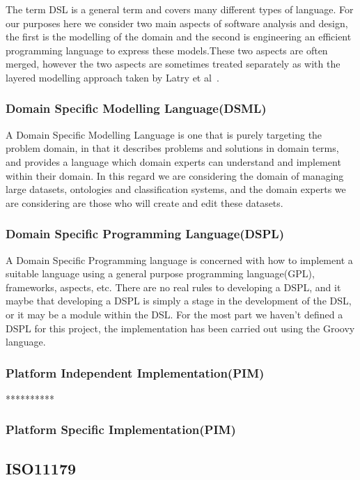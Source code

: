 \documentclass{llncs}
\begin{document}
The term DSL is a general term and covers many different types of language.  For our purposes here we consider two main aspects of software analysis and design, the first is the modelling of the domain and the second is engineering an efficient programming language to express these models.These two aspects are often merged, however the two aspects are sometimes treated separately as with the layered modelling approach taken by Latry et al~\cite{latry2006processing}. 


\subsubsection{Domain Specific Modelling Language(DSML)}

A Domain Specific Modelling Language is one that is purely targeting the problem domain, in that it describes problems and solutions in domain terms, and provides a language which domain experts can understand and implement within their domain. In this regard we are considering the domain of managing large datasets, ontologies and classification systems, and the domain experts we are considering are those who will create and edit these datasets. 

\subsubsection{Domain Specific Programming Language(DSPL)}	
A Domain Specific Programming language is concerned with how to implement a suitable language using a general purpose programming language(GPL), frameworks, aspects, etc. There are no real rules to developing a DSPL, and it maybe that developing a DSPL is simply a stage in the development of the DSL, or it may be a module within the DSL. For the most part we haven't defined a DSPL for this project, the implementation has been carried out using the Groovy language. 

\subsubsection{Platform Independent Implementation(PIM)}

**********
\subsubsection{Platform Specific Implementation(PIM)}

\subsection{ISO11179}
\end{document}
